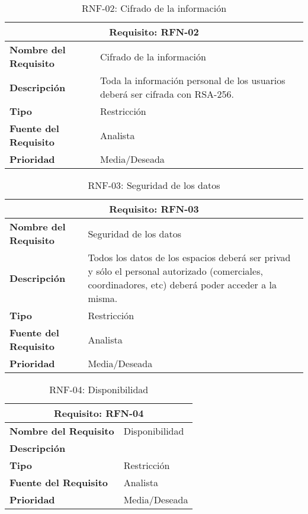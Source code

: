 \begin{table}[H]
\begin{center}
\begin{tabular}{p{} p{7cm}}
\multicolumn{2}{c}{\textbf{Requisito: RFN-02} } \\
\hline \hline
\textbf{Nombre del Requisito} & Cifrado de la información  \\
\hline
\textbf{Descripción} & Toda la información personal de los usuarios deberá ser cifrada con RSA-256.\\
\hline
\textbf{Tipo} & Restricción \\
\hline
\textbf{Fuente del Requisito} &  Analista \\
\hline
\textbf{Prioridad} &  Media/Deseada \\ \hline
\end{tabular}
\caption{RNF-02: Cifrado de la información}
\label{tab:RFN-02}
\end{center}
\end{table}

\begin{table}[H]
\begin{center}
\begin{tabular}{p{} p{7cm}}
\multicolumn{2}{c}{\textbf{Requisito: RFN-03} } \\
\hline \hline
\textbf{Nombre del Requisito} & Seguridad de los datos  \\
\hline
\textbf{Descripción} & Todos los datos de los espacios deberá ser privad y sólo el personal autorizado (comerciales, coordinadores, etc) deberá poder acceder a la misma. \\
\hline
\textbf{Tipo} & Restricción \\
\hline
\textbf{Fuente del Requisito} &  Analista \\
\hline
\textbf{Prioridad} &  Media/Deseada \\ \hline
\end{tabular}
\caption{RNF-03: Seguridad de los datos}
\label{tab:RFN-03}
\end{center}
\end{table}

\begin{table}[H]
\begin{center}
\begin{tabular}{p{} p{7cm}}
\multicolumn{2}{c}{\textbf{Requisito: RFN-04} } \\
\hline \hline
\textbf{Nombre del Requisito} & Disponibilidad  \\
\hline
\textbf{Descripción} &  \\
\hline
\textbf{Tipo} & Restricción \\
\hline
\textbf{Fuente del Requisito} &  Analista \\
\hline
\textbf{Prioridad} &  Media/Deseada \\ \hline
\end{tabular}
\caption{RNF-04: Disponibilidad}
\label{tab:RFN-04}
\end{center}
\end{table}

